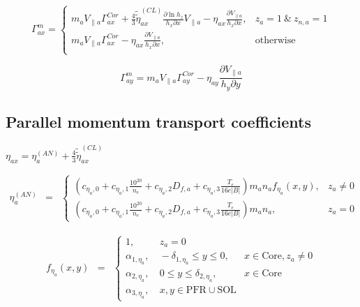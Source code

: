 \documentclass[a4paper,10pt]{report}
\begin{document}
\begin{equation}
\Gamma^m_{ax} = \left\{
\begin{matrix}
m_a V_{\parallel a} \Gamma_{ax}^{Cor} +
\frac 4 3 \widetilde{\widetilde{\eta}}^{(CL)}_{ax} \frac{\partial \ln h_z}{h_x \partial x} V_{\parallel a} -
\eta_{ax} \frac{\partial V_{\parallel a}}{h_x \partial x}, & z_a = 1~\&~z_{n,a} = 1 \\
m_a V_{\parallel a} \Gamma_{ax}^{Cor} -
\eta_{ax} \frac{\partial V_{\parallel a}}{h_x \partial x}, & \mbox{otherwise} \\
\end{matrix}
\right.
\end{equation}

\begin{equation}
\Gamma^m_{ay} =
m_a V_{\parallel a} \Gamma_{ay}^{Cor} -
\eta_{ay} \frac{\partial V_{\parallel a}}{h_y \partial y}
\end{equation}

\subsection{Parallel momentum transport coefficients}

$\eta_{ax} = \eta^{(AN)}_{a} + \frac{4}{3} \widetilde{\widetilde{\eta}}^{(CL)}_{ax}$


\begin{equation}
\begin{matrix}
\eta^{(AN)}_{a} & =
& \left\{
\begin{matrix}
\left( c_{\eta_a,0} + c_{\eta_a,1} \frac{10^{20}}{n_e} + c_{\eta_a,2} D_{f,a} +
c_{\eta _a,3} \frac{T_e}{16 e|B|}\right)
m_a n_a f_{\eta _a}(x,y), & z_a\neq 0 \\
\left( c_{\eta_a,0} + c_{\eta_a,1} \frac{10^{20}}{n_e} + c_{\eta_a,2} D_{f,a} +
c_{\eta _a,3} \frac{T_e}{16 e|B|}\right)
m_a n_a , & z_a = 0
\end{matrix} \right.
\end{matrix}
\end{equation}

\begin{equation}
\begin{matrix}
f_{\eta _a}(x,y) & =
& \left\{
\begin{matrix}
1, & \ z_a = 0 \\
\alpha_{1,\eta _a}, & \ -\delta _{1,\eta _a} \le y \le 0, & x \in \text{Core}, z_a \neq 0 \\
\alpha_{2,\eta _a}, & \ 0\le y\le \delta _{2,\eta _a}, & x \in \text{Core} \\
\alpha_{3,\eta _a}, & \ x,y\in \text{PFR} \cup \text{SOL}
\end{matrix} \right.
\end{matrix}
\end{equation}
\end{document}
